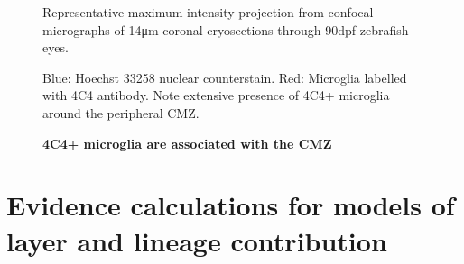 \begin{figure}[!h]
    \caption{{\bf 4C4+ microglia are associated with the CMZ}}
    Representative maximum intensity projection from confocal micrographs of 14\si{\micro\metre} coronal cryosections through 90dpf zebrafish eyes.
    
    Blue: Hoechst 33258 nuclear counterstain. Red: Microglia labelled with 4C4 antibody. Note extensive presence of 4C4+ microglia around the peripheral CMZ.
    \label{4C4micrograph}
\end{figure}

\FloatBarrier

\section{Evidence calculations for models of layer and lineage contribution}
\FloatBarrier

